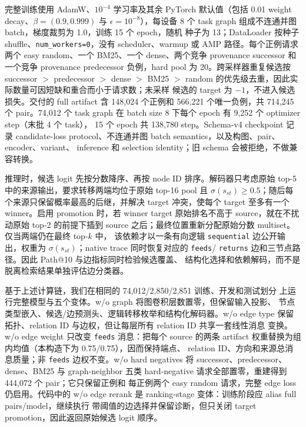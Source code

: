 完整训练使用 AdamW、$10^{-4}$ 学习率及其余 PyTorch 默认值（包括 0.01
weight decay、$\beta=(0.9,0.999)$ 与 $\epsilon=10^{-8}$），每设备 8 个
task graph 组成不连通并图 batch，梯度裁剪为 1.0，训练 15 个 epoch，随机
种子为 13；DataLoader 按种子 shuffle、\texttt{num\_workers=0}，没有
scheduler、warmup 或 AMP 路径。每个正例请求两个 easy random、一个 BM25、一个 dense、两个竞争
provenance successor 和一个竞争 provenance predecessor 负例，hard pool
为 20。跨采样器重复候选按 successor $>$ predecessor $>$ dense $>$ BM25
$>$ random 的优先级去重，因此实际数量可因短缺和重合而小于请求数；未采样
候选的 target 为 $-1$，不进入候选损失。交付的 full artifact 含 148,024
个正例和 566,221 个唯一负例，共 714,245 个 pair。74,012 个 task graph
在 batch size 8 下每个 epoch 有 9,252 个 optimizer step（末批 4 个 task），
15 个 epoch 共 138,780 step。Schema-v4 checkpoint 记录 candidate-loss
protocol、不连通并图 batch semantics，以及构图、pair、encoder、variant、
inference 和 selection identity；旧 schema 会被拒绝，不做兼容转换。

推理时，候选 logit 先按分数降序、再按 node ID 排序。解码器只考虑原始
top-5 中的来源输出，要求转移两端均位于原始 top-16 pool 且
$\sigma(s_{st})\geq0.5$；随后每个来源只保留概率最高的后继，并解决 target
冲突，使每个 target 至多有一个 winner。启用 promotion 时，若 winner
target 原始排名不高于 source，就在不扰动原始 top-2 的前提下插到 source
之后；最终位置重新分配原始分数 multiset。仅当两端仍在最终 top-$k$ 中，
该依赖才以一条有向逻辑 \texttt{sequential} 边公开输出，权重为
$\sigma(s_{st})$；native trace 同时恢复对应的 \texttt{feeds}/
\texttt{returns} 边和三节点路径。因此 Path@10 与边指标同时检验候选覆盖、
结构化选择和依赖解码，而不是脱离检索结果单独评估边分类器。

基于上述计算链，我们在相同的 74,012/2,850/2,851 训练、开发和测试划分
上运行完整模型与五个变体。w/o graph 将图卷积层数置零，但保留输入投影、
节点类型嵌入、候选/边预测头、逻辑转移枚举和结构化解码器。w/o edge type
保留拓扑、relation ID 与边权，但让每层所有 relation ID 共享一套线性消息
变换。w/o edge weight 只改变 \texttt{feeds} 消息：把每个 source 的两条
artifact 权重替换为组内均值（本构造下为 0.75/0.75），因而保持端点、
relation ID、方向和来源总消息质量；非 \texttt{feeds} 边权不变。w/o hard
negatives 将 successor、predecessor、dense、BM25 与 graph-neighbor 五类
hard-negative 请求全部置零，重建得到 444,072 个 pair；它只保留正例和
每正例两个 easy random 请求，完整 edge loss 仍启用。代码中的 w/o edge
rerank 是 ranking-stage 变体：训练阶段应 alias full pairs/model，继续执行
带阈值的边选择并保留诊断，但只关闭 target promotion，因此返回原始候选
logit 顺序。

